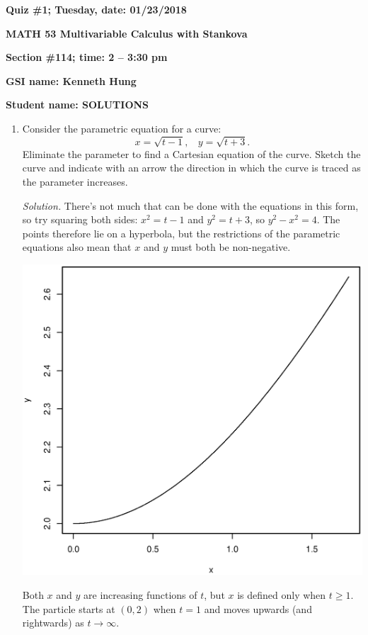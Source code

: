 \documentclass{article}
\begin{document}
{\bf Quiz \#1; Tuesday, date: 01/23/2018}

{\bf MATH 53 Multivariable Calculus with Stankova}

{\bf Section \#114; time: 2 -- 3:30 pm}

{\bf GSI name: Kenneth Hung}

{\bf Student name: SOLUTIONS}

\vspace*{0.25in}

\begin{enumerate}
\item Consider the parametric equation for a curve:
\[
x = \sqrt{t - 1}, ~~~~ y = \sqrt{t + 3}.
\]
Eliminate the parameter to find a Cartesian equation of the curve. Sketch the curve and indicate with an arrow the direction in which the curve is traced as the parameter increases.

\vspace*{0.25in}

{\em Solution.} There's not much that can be done with the equations in this form, so try squaring both sides: $x^2 = t - 1$ and $y^2 = t + 3$, so $y^2 - x^2 = 4$. The points therefore lie on a hyperbola, but the restrictions of the parametric equations also mean that $x$ and $y$ must both be non-negative.

\begin{center}
\includegraphics[width=0.8\linewidth]{quiz01dis114solpic.eps}
\end{center}

Both $x$ and $y$ are increasing functions of $t$, but $x$ is defined only when $t \ge 1$. The particle starts at $(0, 2)$ when $t = 1$ and moves upwards (and rightwards) as $t \to \infty$.


\end{enumerate}
\end{document}
